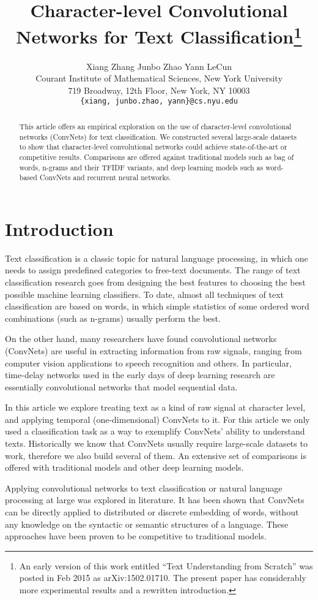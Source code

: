\documentclass{article} \usepackage{nips15submit_e,times}
\title{Character-level Convolutional Networks for Text Classification\thanks{An early version of this work entitled ``Text Understanding from Scratch'' was posted in Feb 2015 as arXiv:1502.01710. The present paper has considerably more experimental results and a rewritten introduction.}}
\author{
  Xiang Zhang \qquad Junbo Zhao \qquad Yann LeCun \\
  Courant Institute of Mathematical Sciences, New York University \\
  719 Broadway, 12th Floor, New York, NY 10003 \\
\texttt{\{xiang, junbo.zhao, yann\}@cs.nyu.edu} \\
}
\begin{document}
\maketitle

\begin{abstract}
This article offers an empirical exploration on the use of character-level convolutional networks (ConvNets) for text classification. We constructed several large-scale datasets to show that character-level convolutional networks could achieve state-of-the-art or competitive results. Comparisons are offered against traditional models such as bag of words, n-grams and their TFIDF variants, and deep learning models such as word-based ConvNets and recurrent neural networks.
\end{abstract}

\section{Introduction}

Text classification is a classic topic for natural language processing, in which one needs to assign predefined categories to free-text documents. The range of text classification research goes from designing the best features to choosing the best possible machine learning classifiers. To date, almost all techniques of text classification are based on words, in which simple statistics of some ordered word combinations (such as n-grams) usually perform the best\cite{J98}.

On the other hand, many researchers have found convolutional networks (ConvNets)\cite{LBDHHHJ89}\cite{LBBH98} are useful in extracting information from raw signals, ranging from computer vision applications to speech recognition and others. In particular, time-delay networks used in the early days of deep learning research are essentially convolutional networks that model sequential data\cite{BFBL89}\cite{WHHSL89}.

In this article we explore treating text as a kind of raw signal at character level, and applying temporal (one-dimensional) ConvNets to it. For this article we only used a classification task as a way to exemplify ConvNets' ability to understand texts. Historically we know that ConvNets usually require large-scale datasets to work, therefore we also build several of them. An extensive set of comparisons is offered with traditional models and other deep learning models.

Applying convolutional networks to text classification or natural language processing at large was explored in literature. It has been shown that ConvNets can be directly applied to distributed\cite{SG14}\cite{K14} or discrete\cite{JZ14} embedding of words, without any knowledge on the syntactic or semantic structures of a language. These approaches have been proven to be competitive to traditional models.
\end{document}
